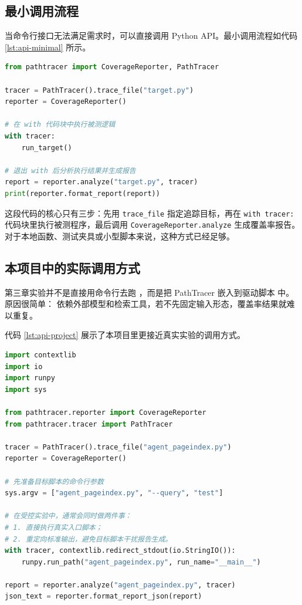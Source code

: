 \subsection{最小调用流程}

当命令行接口无法满足需求时，可以直接调用 Python API。最小调用流程如代码 \ref{lst:api-minimal} 所示。

\begin{lstlisting}[language=Python, caption={PathTracer 最小 API 调用流程}, label={lst:api-minimal}]
from pathtracer import CoverageReporter, PathTracer

tracer = PathTracer().trace_file("target.py")
reporter = CoverageReporter()

# 在 with 代码块中执行被测逻辑
with tracer:
    run_target()

# 退出 with 后分析执行结果并生成报告
report = reporter.analyze("target.py", tracer)
print(reporter.format_report(report))
\end{lstlisting}

这段代码的核心只有三步：先用 \texttt{trace\_file} 指定追踪目标，再在 \texttt{with tracer:} 代码块里执行被测程序，最后调用 \texttt{CoverageReporter.analyze} 生成覆盖率报告。对于本地函数、测试夹具或小型脚本来说，这种方式已经足够。

\subsection{本项目中的实际调用方式}

第三章实验并不是直接用命令行去跑 ，而是把 PathTracer 嵌入到驱动脚本  中。原因很简单： 依赖外部模型和检索工具，若不先固定输入形态，覆盖率结果就难以重复。

代码 \ref{lst:api-project} 展示了本项目里更接近真实实验的调用方式。

\begin{lstlisting}[language=Python, caption={本项目中的 PathTracer API 用法}, label={lst:api-project}]
import contextlib
import io
import runpy
import sys

from pathtracer.reporter import CoverageReporter
from pathtracer.tracer import PathTracer

tracer = PathTracer().trace_file("agent_pageindex.py")
reporter = CoverageReporter()

# 先准备目标脚本的命令行参数
sys.argv = ["agent_pageindex.py", "--query", "test"]

# 在受控实验中，通常会同时做两件事：
# 1. 直接执行真实入口脚本；
# 2. 重定向标准输出，避免目标脚本干扰报告生成。
with tracer, contextlib.redirect_stdout(io.StringIO()):
    runpy.run_path("agent_pageindex.py", run_name="__main__")

report = reporter.analyze("agent_pageindex.py", tracer)
json_text = reporter.format_report_json(report)
\end{lstlisting}

